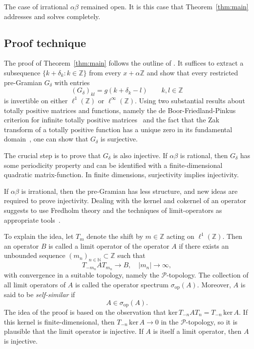 \documentclass[reqno,a4paper,12pt]{amsart}
\numberwithin{equation}{section}
\def\N{{\mathbb N}}
\def\Z{{\mathbb Z}}
\newcommand\1{\mathds{1}}
\begin{document}
The case of irrational $\alpha \beta $ remained open. It is this case
that Theorem~\ref{thm:main} addresses and solves completely.  

\subsection{Proof technique}
The proof of Theorem~\ref{thm:main} follows the outline of
\cite{Groechenig2023}. It suffices to extract a subsequence $\{ k+
\delta _k: k\in \Z\}$ from every $x+\alpha \Z$ and show that every 
restricted pre-Gramian $G_\delta$ with entries
\begin{equation}
  \label{eq:c3}
(G_\delta)_{kl} =  g(k+\delta _k - l) \qquad k,l  \in \Z  
\end{equation}
is invertible on either $\ell ^1(\Z )$ or $\ell ^\infty (\Z )$. 
Using two substantial results about totally positive matrices and
functions, namely the 
de Boor-Friedland-Pinkus criterion for infinite totally positive
matrices~\cite{deBoorFriedlandPinkus1982} and the fact that the Zak
transform of a totally positive function has a  unique zero in its
fundamental domain~\cite{VinogradovUlitskaya2017}, one can show that
$G _\delta $ is surjective.

The crucial step is   to prove  that $G _\delta $ is also injective. 
If  $\alpha\beta$ is rational, then $G_\delta $ has some periodicity
property 
and can be identified with a finite-dimensional quadratic  matrix-function\cite{zibulskiZeevi1997analysis,zeeviZibulskiPorat1998multiwindow}.  In
finite dimensions, surjectivity implies injectivity. 

If $\alpha \beta $ is irrational, then the pre-Gramian has less
structure, and new ideas are required to prove injectivity. Dealing
with the kernel and cokernel of an operator suggests to use   Fredholm
theory and the techniques of limit-operators as appropriate
tools~\cite{lindner2006infinite,rabinovitch2004limit,seidel2015semi}.  

To explain the idea, let  $T_m$ denote the shift by $m\in \Z $ acting  on
$\ell^1(\mathbb Z)$. Then an operator $B$ is called a limit operator of the operator $A$ if there exists an unbounded sequence $(m_n)_{n \in \N} \subset \Z$ such that
$$
T_{-m_n} A T_{m_n} \to B, \quad |m_n|\to\infty,
$$
with convergence in a suitable topology, namely the $\mathcal
P$-topology. The collection of all limit operators of $A$ is called
the operator spectrum $\sigma_{\mathrm{op}}(A)$.
Moreover, $A$ is said to be \emph{self-similar}  if
$$
A\in\sigma_{\mathrm{op}}(A).
$$
The idea of the proof is based on the observation that
$\mathrm{ker}\,T_{-n}AT_{n} = T_{-n} \, \mathrm{ker}\, A$. If this kernel  
is finite-dimensional, then $T_{-n} \,  \mathrm{ker} \, A \to 0$ in the
$\mathcal{P}$-topology, so it is plausible that the limit operator is
injective. If $A$ is itself a limit operator, then $A$ is injective.
\end{document}
